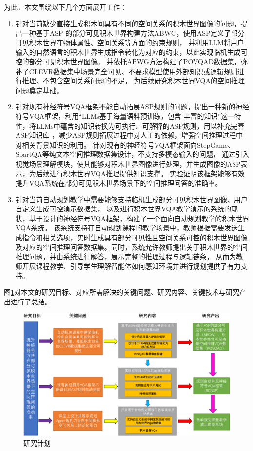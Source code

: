 为此，本文围绕以下几个方面展开工作：
\begin{enumerate}[nosep]
\item 针对当前缺少直接生成积木间具有不同的空间关系的积木世界图像的问题，提出一种基于ASP
的部分可见积木世界构建方法ABWG，使用ASP定义了部分可见积木世界在物体属性、空间关系等方面的约束规则，
并利用LLM将用户输入的自然语言的积木世界生成指令转化为对应的约束，以此实现临机生成可控的部分可见积木世界图像。
并依托ABWG方法构建了POVQAD数据集，弥补了CLEVR数据集中场景完全可见、不要求模型使用外部知识或逻辑规则进行推理、不包含空间关系问题的不足，
为后续研究积木世界VQA的空间推理问题奠定基础。
\item 针对现有神经符号VQA框架不能自动拓展ASP规则的问题，提出一种新的神经符号VQA框架，利用“LLMs基于海量语料预训练，包含
丰富的知识”这一特性，将LLMs中蕴含的知识转换为可执行、可解释的ASP规则，用以补充完善ASP知识库
，减少ASP规则拓展过程中对人工的依赖，增强空间推理过程中对相关背景知识的利用。
针对现有的神经符号VQA框架面向StepGame、SpartQA等纯文本空间推理数据集设计，不支持多模态输入的问题，
通过引入视觉场景理解模块，使其能够对积木世界图像进行处理，并生成图像的ASP表示，为后续进行积木世界VQA推理提供知识支撑。
实验证明该框架能够有效提升VQA系统在部分可见积木世界场景下的空间推理问答的准确率。
\item 针对当前自动规划教学中需要能够支持临机生成部分可见积木世界图像、用户自定义生成可控演示数据集，
以及进行积木世界VQA教学演示的系统的现状，基于设计的神经符号VQA框架，构建了一个面向自动规划教学的积木世界VQA系统。
该系统支持在自动规划课程的教学场景中，教师根据需要发送生成指令和相关选项，实时生成具有部分可见性且空间关系可控的积木世界图像
及对应的空间推理问答数据集。同时，系统允许教师提出关于积木世界的空间推理问题，并由系统进行解答，展示完整的推理过程与逻辑链条，
从而为教师开展课程教学、引导学生理解智能体如何感知环境并进行规划提供了有力支持。
\end{enumerate}

图\ref{plan}对本文的研究目标、对应所需解决的关键问题、研究内容、关键技术与研究产出进行了总结。
\begin{figure}[h]
    \centering
    \includegraphics[width=\textwidth]{figures/研究方法-crop.pdf}
    \caption{研究计划}
    \label{plan}
\end{figure}
